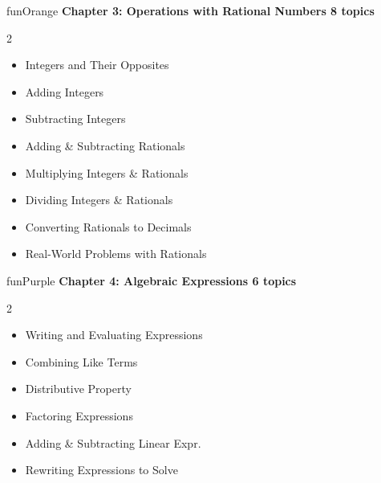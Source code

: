 {\vspace{2mm}

\begin{wbChapterStripe}{funOrange}
{\small\bfseries\color{black!80}Chapter 3: Operations with Rational Numbers%
\hfill\normalfont\color{black!50}8 topics}

\vspace{1mm}
\small
\begin{multicols}{2}
\begin{itemize}[leftmargin=4mm, itemsep=1pt, topsep=1pt]
    \item Integers and Their Opposites
    \item Adding Integers
    \item Subtracting Integers
    \item Adding \& Subtracting Rationals
    \item Multiplying Integers \& Rationals
    \item Dividing Integers \& Rationals
    \item Converting Rationals to Decimals
    \item Real-World Problems with Rationals
\end{itemize}
\end{multicols}
\end{wbChapterStripe}

\vspace{2mm}

\begin{wbChapterStripe}{funPurple}
{\small\bfseries\color{black!80}Chapter 4: Algebraic Expressions%
\hfill\normalfont\color{black!50}6 topics}

\vspace{1mm}
\small
\begin{multicols}{2}
\begin{itemize}[leftmargin=4mm, itemsep=1pt, topsep=1pt]
    \item Writing and Evaluating Expressions
    \item Combining Like Terms
    \item Distributive Property
    \item Factoring Expressions
    \item Adding \& Subtracting Linear Expr.
    \item Rewriting Expressions to Solve
\end{itemize}
\end{multicols}
\end{wbChapterStripe}

}
